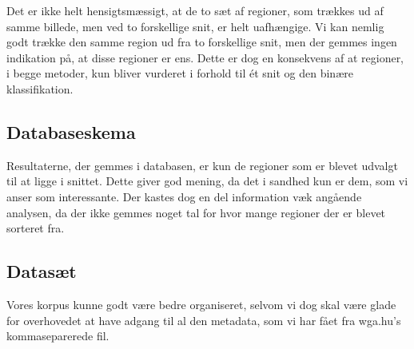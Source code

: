 {Det er ikke helt hensigtsmæssigt, at de to sæt af regioner, som trækkes
ud af samme billede, men ved to forskellige snit, er helt uafhængige. Vi
kan nemlig godt trække den samme region ud fra to forskellige snit, men
der gemmes ingen indikation på, at disse regioner er ens.  Dette er dog
en konsekvens af at regioner, i begge metoder, kun bliver vurderet i
forhold til ét snit og den binære klassifikation.

\subsection{Databaseskema}
Resultaterne, der gemmes i databasen, er kun de regioner som er blevet
udvalgt til at ligge i snittet. Dette giver god mening, da det i sandhed
kun er dem, som vi anser som interessante. Der kastes dog en del
information væk angående analysen, da der ikke gemmes noget tal for hvor
mange regioner der er blevet sorteret fra.

\subsection{Datasæt}
Vores korpus kunne godt være bedre organiseret, selvom vi dog skal være
glade for overhovedet at have adgang til al den metadata, som vi har
fået fra wga.hu's kommaseparerede fil.

}
